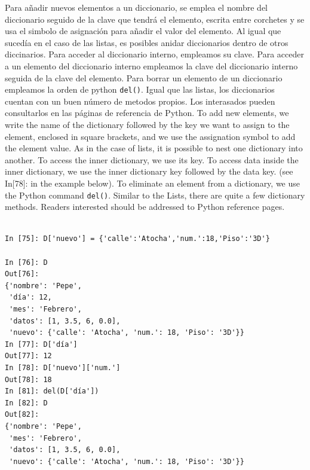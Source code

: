 \begin{paracol}{2}
Para añadir nuevos elementos a un diccionario, se emplea el nombre del diccionario seguido de la clave que tendrá el elemento, escrita entre corchetes y se usa el simbolo de asignación para añadir el valor del elemento. Al igual que sucedía en el caso de las listas, es posibles anidar diccionarios dentro de otros diccinarios. Para acceder al diccionario interno, empleamos su clave. Para acceder a un elemento del diccionario interno empleamos la clave del diccionario interno seguida de la clave del elemento. Para borrar un elemento de un diccionario empleamos la orden de python \texttt{del()}. Igual que las listas, los diccionarios cuentan con un buen número de metodos propios. Los interasados pueden consultarlos en las páginas de referencia de Python.
\switchcolumn
To add new elements, we write the name of the dictionary followed by the key we want to assign to the element, enclosed in square brackets, and we use the assignation symbol to add the element value. As in the case of lists, it is possible to nest one dictionary into another. To access the inner dictionary, we use its key. To access data inside the inner dictionary, we use the inner dictionary key followed by the data key. (see In[78]: in the example below). To eliminate an element from a dictionary, we use the Python command \texttt{del()}. Similar to the Lists, there are quite a few dictionary methods. Readers interested should be addressed to Python reference pages.
\end{paracol}

\begin{verbatim}

In [75]: D['nuevo'] = {'calle':'Atocha','num.':18,'Piso':'3D'}

In [76]: D
Out[76]: 
{'nombre': 'Pepe',
 'día': 12,
 'mes': 'Febrero',
 'datos': [1, 3.5, 6, 0.0],
 'nuevo': {'calle': 'Atocha', 'num.': 18, 'Piso': '3D'}}
In [77]: D['día']
Out[77]: 12
In [78]: D['nuevo']['num.']
Out[78]: 18
In [81]: del(D['día'])
In [82]: D
Out[82]: 
{'nombre': 'Pepe',
 'mes': 'Febrero',
 'datos': [1, 3.5, 6, 0.0],
 'nuevo': {'calle': 'Atocha', 'num.': 18, 'Piso': '3D'}}
\end{verbatim}


